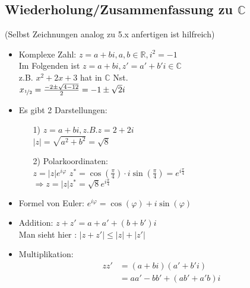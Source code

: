 \documentclass[a4paper, 12pt,titlepage, pdf, headsepline]{article}
\newcommand{\R}{\mathds{R}}
\newcommand{\C}{\mathds{C}}
\renewcommand{\>}{\rightarrow}
\renewcommand{\*}{\cdot}
\renewcommand{\phi}{\varphi}
\begin{document}
		      			\subsection{Wiederholung/Zusammenfassung zu $\C$}
		      			(Selbst Zeichnungen analog zu 5.x anfertigen ist hilfreich)
		      			\begin{itemize}
		      				\item Komplexe Zahl: $z = a +bi, a,b \in \R, i^2 = -1$\\
		      				      Im Folgenden ist $z = a +bi, z' = a' + b'i \in \C$\\
		      				      z.B. $x^2 + 2x +3$ hat in $\C$ Nst.\\
		      				      $x_{\nicefrac{1}{2}} = \frac{-2 \pm \sqrt{4-12}}{2} = -1 \pm \sqrt{2}i$\\
		      				\item Es gibt 2 Darstellungen: \\		
		      				      \begin{itemize}
		      				      	\item[1)]
		      				      	      $z = a +bi, z.B. z = 2 + 2i$\\
		      				      	      $|z| = \sqrt{a^2 + b^2} = \sqrt{8}$
		      				      	\item[2)]
		      				      	      Polarkoordinaten: \\
		      				      	      $z = |z| e^{i\phi}$
		      				      	      $z^* = \cos(\frac{\pi}{4}) \cdot i \sin(\frac{\pi}{4}) = e^{i\frac{\pi}{4}}$ \\
		      				      	      $\Rightarrow z = |z| z^* = \sqrt{8} e^{i\frac{\pi}{4}}$
		      				      \end{itemize} 
		      				\item Formel von Euler: $e^{i\phi} = \cos(\phi) + i \sin(\phi)$
		      				\item Addition: $z + z' = a +a' + (b+ b')i$ \\
		      				      Man sieht hier : $ |z + z'| \leq |z| + |z'|$
		      				\item Multiplikation: 
		      				      \begin{align*}
		      				      	zz' & = (a + bi)(a'+b'i)             \\
		      				      	    & = aa' - bb'+(ab'+a'b)i         \\

\end{align*}
\end{itemize}
\end{document}
